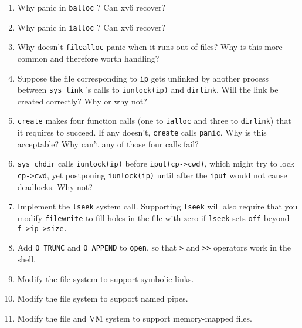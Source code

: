 \begin{enumerate}

\item Why panic in
\lstinline{balloc} ?
Can xv6 recover?

\item Why panic in
\lstinline{ialloc} ?
Can xv6 recover?

\item Why doesn't
\lstinline{filealloc}
panic when it runs out of files?
Why is this more common and therefore worth handling?

\item Suppose the file corresponding to 
\lstinline{ip}
gets unlinked by another process
between 
\lstinline{sys_link} 's
calls to 
\lstinline{iunlock(ip)}
and
\lstinline{dirlink}.
Will the link be created correctly?
Why or why not?

\item
\lstinline{create}
makes four function calls (one to
\lstinline{ialloc}
and three to
\lstinline{dirlink})
that it requires to succeed.
If any doesn't,
\lstinline{create}
calls
\lstinline{panic}.
Why is this acceptable?
Why can't any of those four calls fail?

\item
\lstinline{sys_chdir}
calls
\lstinline{iunlock(ip)}
before
\lstinline{iput(cp->cwd)},
which might try to lock
\lstinline{cp->cwd},
yet postponing
\lstinline{iunlock(ip)}
until after the
\lstinline{iput}
would not cause deadlocks.
Why not?

\item Implement the
\lstinline{lseek}
system call.  Supporting
\lstinline{lseek}
will also require that you modify
\lstinline{filewrite}
to fill holes in the file with zero if
\lstinline{lseek}
sets
\lstinline{off}
beyond
\lstinline{f->ip->size.}

\item Add
\lstinline{O_TRUNC}
and
\lstinline{O_APPEND}
to
\lstinline{open},
so that
\lstinline{>}
and
\lstinline{>>}
operators work in the shell.

\item Modify the file system to support symbolic links.

\item Modify the file system to support named pipes.

\item Modify the file and VM system to support memory-mapped files.

\end{enumerate}
